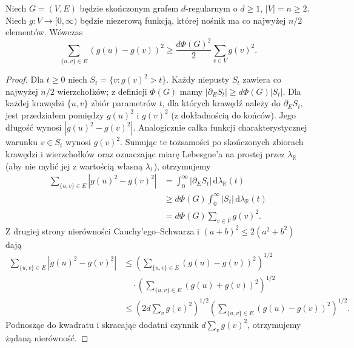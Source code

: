\begin{lemat}
\label{lem:tg-expander-coarea}
Niech $G=(V,E)$ będzie skończonym grafem
$d$-regularnym o $d\geq1$, $|V|=n\geq2$.
Niech $g:V\to[0,\infty)$ będzie niezerową
funkcją, której nośnik ma co najwyżej $n/2$
elementów. Wówczas
\[
\sum_{\{u,v\}\in E}(g(u)-g(v))^2
\geq\frac{d\Phi(G)^2}{2}\sum_{v\in V}g(v)^2.
\]
\end{lemat}
\begin{proof}
Dla $t\geq0$ niech
$S_t=\{v:g(v)^2>t\}$.
Każdy niepusty $S_t$
zawiera co najwyżej $n/2$ wierzchołków;
z definicji $\Phi(G)$ mamy
$|\partial_ES_t|\geq d\Phi(G)|S_t|$.
Dla każdej krawędzi $\{u,v\}$ zbiór parametrów $t$,
dla których krawędź należy do $\partial_E S_t$,
jest przedziałem pomiędzy $g(u)^2$ i $g(v)^2$
(z dokładnością do końców). Jego długość wynosi
$|g(u)^2-g(v)^2|$. Analogicznie całka funkcji
charakterystycznej warunku $v\in S_t$ wynosi
$g(v)^2$. Sumując te tożsamości po skończonych
zbiorach krawędzi i wierzchołków oraz oznaczając
miarę Lebesgue'a na prostej przez $\lambda_{\mathbb R}$ (aby nie
mylić jej z wartością własną $\lambda_1$), otrzymujemy
\[
\begin{aligned}
\sum_{\{u,v\}\in E}|g(u)^2-g(v)^2|
&=\int_0^\infty|\partial_ES_t|\,\mathrm d\lambda_{\mathbb R}(t)\\
&\geq d\Phi(G)\int_0^\infty|S_t|\,\mathrm d\lambda_{\mathbb R}(t)\\
&=d\Phi(G)\sum_{v\in V}g(v)^2.
\end{aligned}
\]
Z drugiej strony nierówności
Cauchy'ego--Schwarza i
$(a+b)^2\leq2(a^2+b^2)$ dają
\[
\begin{aligned}
\sum_{\{u,v\}\in E}|g(u)^2-g(v)^2|
&\leq
\left(\sum_{\{u,v\}\in E}(g(u)-g(v))^2\right)^{1/2}\\
&\quad{}\cdot
\left(\sum_{\{u,v\}\in E}(g(u)+g(v))^2\right)^{1/2}\\
&\leq
\left(2d\sum_v g(v)^2\right)^{1/2}
\left(\sum_{\{u,v\}\in E}(g(u)-g(v))^2\right)^{1/2}.
\end{aligned}
\]
Podnosząc do kwadratu
i skracając dodatni czynnik
$d\sum_vg(v)^2$, otrzymujemy
żądaną nierówność.
\end{proof}

